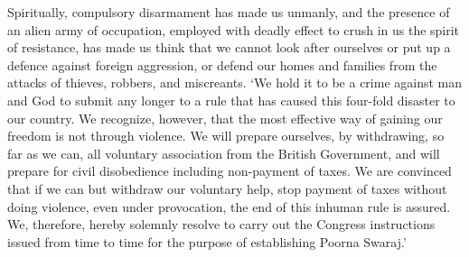 \begin{multicols}{2}
Spiritually, compulsory disarmament has made us unmanly, and the presence of an alien army of occupation, employed with deadly effect to crush in us the spirit of resistance, has made us think that we cannot look after ourselves or put up a defence against foreign aggression, or defend our homes and families from the attacks of thieves, robbers, and miscreants. `We hold it to be a crime against man and God to submit any longer to a rule that has caused this four-fold disaster to our country. We recognize, however, that the most effective way of gaining our freedom is not through violence. We will prepare ourselves, by withdrawing, so far as we can, all voluntary association from the British Government, and will prepare for civil disobedience including non-payment of taxes. We are convinced that if we can but withdraw our voluntary help, stop payment of taxes without doing violence, even under provocation, the end of this inhuman rule is assured. We, therefore, hereby solemnly resolve to carry out the Congress instructions issued from time to time for the purpose of establishing Poorna Swaraj.'
\end{multicols}